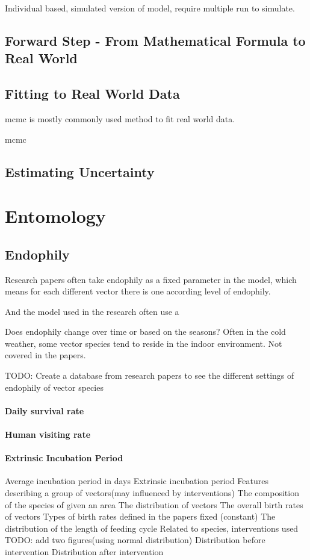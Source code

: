 \documentclass[a4paper, 12pt, twoside]{article}
\begin{document}
Individual based, simulated version of model, require multiple run to simulate.

\subsection{Forward Step - From Mathematical Formula to Real World}

\subsection{Fitting to Real World Data}
\gls{mcmc} is mostly commonly used method to fit real world data.

\gls{mcmc}

\subsection{Estimating Uncertainty}

\section{Entomology}
\subsection{Endophily}
Research papers often take endophily as a fixed parameter in the model, which means for each different vector there is one according level of endophily.

And the model used in the research often use a 

Does endophily change over time or based on the seasons? Often in the cold weather, some vector species tend to reside in the indoor environment. Not covered in the papers.

TODO:
Create a database from research papers to see the different settings of endophily of vector species

\paragraph{Daily survival rate}

\paragraph{Human visiting rate}

\paragraph{Extrinsic Incubation Period}
Average incubation period in days
Extrinsic incubation period
Features describing a group of vectors(may influenced by interventions)
The composition of the species of given an area
The distribution of vectors
The overall birth rates of vectors
	Types of birth rates defined in the papers
fixed (constant)
The distribution of the length of feeding cycle
Related to species, interventions used
TODO: add two figures(using normal distribution)
Distribution before intervention
Distribution after intervention
\end{document}
